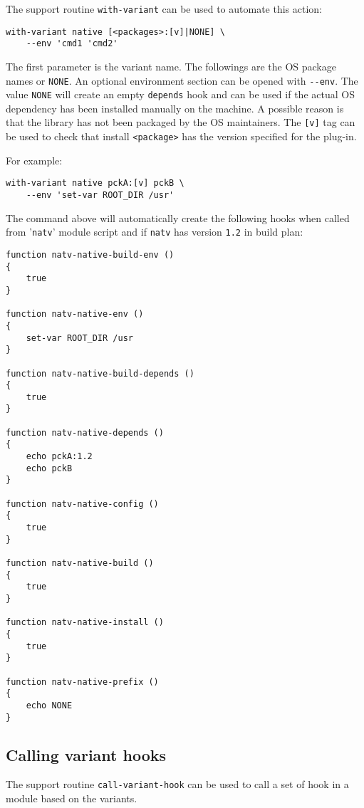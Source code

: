 \documentclass[a4paper,12pt,twoside]{article}
\newcommand{\code}[1]{\texttt{#1}}
\newcommand{\file}[1]{'{\texttt{#1}}'}
\newcommand{\ddash}{-{}-}
\begin{document}
The support routine \code{with-variant} can be used to automate this action:

\begin{lstlisting}
with-variant native [<packages>:[v]|NONE] \
	--env 'cmd1 'cmd2'
\end{lstlisting}

The first parameter is the variant name. The followings are the OS package names or \code{NONE}. An optional environment section can be opened with \code{\ddash{}env}. The value \code{NONE} will create an empty \code{depends} hook and can be used if the actual OS dependency has been installed manually on the machine. A possible reason is that the library has not been packaged by the OS maintainers. The \code{[v]} tag can be used to check that install \code{<package>} has the version specified for the plug-in.

For example:

\begin{lstlisting}
with-variant native pckA:[v] pckB \
	--env 'set-var ROOT_DIR /usr'
\end{lstlisting}

The command above will automatically create the following hooks when called from \file{natv} module script and if \code{natv} has version \code{1.2} in build plan:

\begin{lstlisting}
function natv-native-build-env ()
{
	true
}

function natv-native-env ()
{
	set-var ROOT_DIR /usr
}

function natv-native-build-depends ()
{
	true
}

function natv-native-depends ()
{
	echo pckA:1.2
	echo pckB
}

function natv-native-config ()
{
	true
}

function natv-native-build ()
{
	true
}

function natv-native-install ()
{
	true
}

function natv-native-prefix ()
{
	echo NONE
}
\end{lstlisting}

\subsection{Calling variant hooks}
\label{call variant hooks}

The support routine \code{call-variant-hook} can be used to call a set of hook in a module based on the variants.
\end{document}
